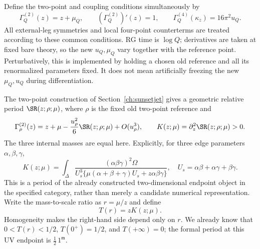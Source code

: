 \documentclass[11pt,a4paper,oneside]{article}
\theoremstyle{plain}
\theoremstyle{definition}
\theoremstyle{remark}
\numberwithin{equation}{section}
\begin{document}
Define the two-point and coupling conditions simultaneously by
\begin{equation}\label{momrg:eq:conditions}
 \Gamma_Q^{(2)}(z)=z+\mu_Q,\qquad
 (\Gamma_Q^{(2)})'(z)=1,\qquad
 \Gamma_Q^{(4)}(\kappa_z)=16\pi^2u_Q.
\end{equation}
All external-leg symmetries and local four-point counterterms are treated according to these common conditions.
RG time is $\log Q$; derivatives are taken at fixed bare theory,
so the new $u_Q,\mu_Q$ vary together with the reference point.
Perturbatively, this is implemented by holding a chosen old reference and all its renormalized parameters fixed.
It does not mean artificially freezing the new $\mu_Q,u_Q$ during differentiation.

The two-point construction of Section~\ref{ch:sunsetjet} gives a geometric relative period $\SR(z;\rho;\mu)$,
where $\rho$ is the fixed old two-point reference and
\begin{equation}\label{momrg:eq:sunset-input}
 \Gamma_\rho^{(2)}(z)
 =z+\mu-\frac{u_\rho^2}{6}\SR(z;\rho;\mu)+O(u_\rho^3),
 \qquad
 K(z;\mu)=\partial_z^2\SR(z;\rho;\mu)>0.
\end{equation}
The three internal masses are equal here.
Explicitly, for three edge parameters $\alpha,\beta,\gamma$,
\begin{equation}\label{momrg:eq:K}
 K(z;\mu)=\int_\Delta
 \frac{(\alpha\beta\gamma)^2\Omega}
 {U_s^3\{\mu(\alpha+\beta+\gamma)U_s+z\alpha\beta\gamma\}},
 \quad U_s=\alpha\beta+\alpha\gamma+\beta\gamma.
\end{equation}
This is a period of the already constructed two-dimensional endpoint object in the specified category, rather than merely a candidate numerical representation.
Write the mass-to-scale ratio as $r=\mu/z$ and define
\begin{equation}\label{momrg:eq:threshold-sunset}
 T(r)=zK(z;\mu).
\end{equation}
Homogeneity makes the right-hand side depend only on $r$. We already know that $0<T(r)<1/2$,
$T(0^+)=1/2$, and $T(+\infty)=0$;
the formal period at this UV endpoint is $\frac12\,1^{\mathfrak m}$.
\end{document}
